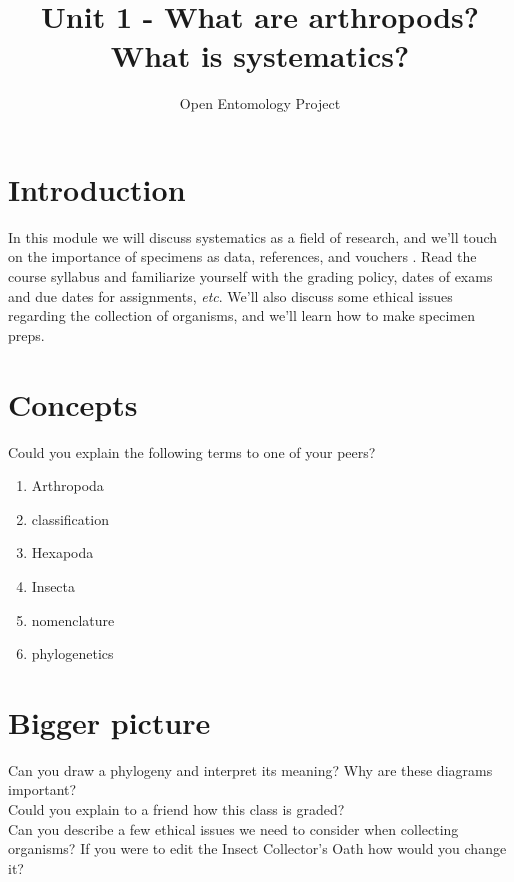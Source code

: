 \documentclass[11pt,letterpaper]{article}
\title{Unit 1 - What are arthropods? What is systematics?}
\author{Open Entomology Project}
\begin{document}
\cleanlookdateon %
\maketitle
\thispagestyle{fancy}
\section*{Introduction}
In this module we will discuss systematics as a field of research, and we'll touch on the importance of specimens as data, references, and vouchers \citep{vouchers}. Read the course syllabus and familiarize yourself with the grading policy, dates of exams and due dates for assignments, \textit{etc}. We'll also discuss some ethical issues regarding the collection of organisms, and we'll learn how to make specimen preps.

\section*{Concepts}
Could you explain the following terms to one of your peers?
\begin{enumerate} 
\item Arthropoda
\item classification
\item Hexapoda
\item Insecta
\item nomenclature
\item phylogenetics 
\end{enumerate}



\section*{Bigger picture}
Can you draw a phylogeny and interpret its meaning? Why are these diagrams important?\\

\noindent{}Could you explain to a friend how this class is graded?\\

\noindent{}Can you describe a few ethical issues we need to consider when collecting organisms? If you were to edit the Insect Collector's Oath \citep{oath} how would you change it?



\end{document}
